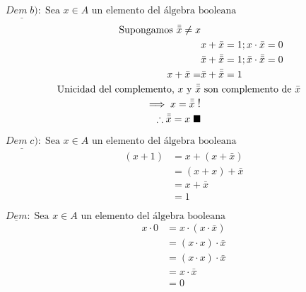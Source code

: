 \begin{multicols}{2}
	\noindent
	$\underline{Dem \;b)}:\; \text{Sea $x\in A$ un elemento del álgebra booleana}$
	\begin{align*}
		\text{Supongamos } \bar{\bar{x}}\neq x                                                                               \\
		                                                            & x+\bar{x}=1; x\cdot{\bar{x}}=0                         \\
		                                                            & \bar{x}+\bar{\bar{x}}=1; \bar{x}\cdot{\bar{\bar{x}}}=0 \\
		x+\bar{x}=                                                  & \bar{x}+\bar{\bar{x}}=1                                \\
		\text{Unicidad del complemento, }x \text{ y } \bar{\bar{x}} & \text{ son complemento de } \bar{x}                    \\
		\implies x = \bar{\bar{x}} \mathrel{\text{\large!}}                                                                  \\
		\therefore \bar{\bar{x}}= x\;\blacksquare
	\end{align*}
\end{multicols}

\begin{multicols}{2}
	\noindent
	$\underline{Dem \;c)}:\; \text{Sea $x\in A$ un elemento del álgebra booleana}$
	\begin{align*}
		(x+1) & = x+(x+\bar{x}) \\
		      & = (x+x)+\bar{x} \\
		      & = x+\bar{x}     \\
		      & = 1
	\end{align*}

	\columnbreak

	\noindent
	$\underline{Dem}:\; \text{Sea $x\in A$ un elemento del álgebra booleana}$
	\begin{align*}
		x\cdot0 & = x\cdot(x\cdot \bar{x})  \\
		        & = (x\cdot x)\cdot \bar{x} \\
		        & = (x\cdot x)\cdot \bar{x} \\
		        & = x\cdot \bar{x}          \\
		        & = 0
	\end{align*}
\end{multicols}


